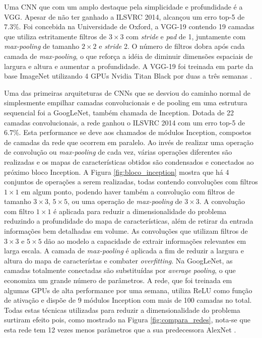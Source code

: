 Uma CNN que com um amplo destaque pela simplicidade e profundidade é a VGG. Apesar de não ter ganhado a ILSVRC 2014, alcançou um erro top-5 de $7.3\%$. Foi concebida na Universidade de Oxford, a VGG-19 contendo 19 camadas que utiliza estritamente filtros de $3 \times 3$ com \emph{stride} e \emph{pad} de 1, juntamente com \emph{max-pooling} de tamanho $2 \times 2$ e \emph{stride} 2. O número de filtros dobra após cada camada de \emph{max-pooling}, o que reforça a idéia de diminuir dimensões espaciais de largura e altura e aumentar a profundidade. A VGG-19 foi treinada em parte da base ImageNet utilizando 4 GPUs Nvidia Titan Black por duas a três semanas \cite{vggnet}.

Uma das primeiras arquiteturas de CNNs que se desviou do caminho normal de simplesmente empilhar camadas convolucionais e de pooling em uma estrutura sequencial foi a GoogLeNet, também chamada de Inception. Dotada de 22 camadas convolucionais, a rede ganhou o ILSVRC 2014 com um erro top-5 de $6.7\%$. Esta performance se deve aos chamados de módulos Inception, compostos de camadas da rede que ocorrem em paralelo. Ao invés de realizar uma operação de convolução ou \emph{max-pooling} de cada vez, várias operações diferentes são realizadas e os mapas de características obtidos são condensados e conectados ao próximo bloco Inception. A Figura \ref{fig:bloco_inception} mostra que há 4 conjuntos de operações a serem realizadas, todas contendo convoluções com filtros $1 \times 1$ em algum ponto, podendo haver também a convolução com filtros de tamanho $3 \times 3$, $5 \times 5$, ou uma operação de \emph{max-pooling} de $3\times 3$. A convolução com filtro $1\times 1$ é aplicada para reduzir a dimensionalidade do problema reduzindo a profundidade do mapa de características, além de retirar da entrada informações bem detalhadas em volume. As convoluções que utilizam filtros de $3\times 3$ e $5\times 5$ dão ao modelo a capacidade de extrair informações relevantes em larga escala. A camada de \emph{max-pooling} é aplicada a fim de reduzir a largura e altura do mapa de característas e combater \emph{overfitting}. Na GoogLeNet, as camadas totalmente conectadas são substituídas por \emph{average pooling}, o que economiza um grande número de parâmetros. A rede, que foi treinada em algumas GPUs de alta performance por uma semana, utiliza ReLU como função de ativação e dispõe de 9 módulos Inception com mais de 100 camadas no total. Todas estas técnicas utilizadas para reduzir a dimensionalidade do problema surtiram efeito pois, como mostrado na Figura \ref{fig:compara_redes},  nota-se que esta rede tem 12 vezes menos parâmetros que a sua predecessora AlexNet \cite{inception}.

